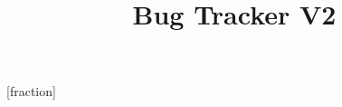 \documentclass{beamer}
\author[\color{white}Alexandru Manafu]{}
\title[Bug Tracker]{ \color{azure(colorwheel)}Bug Tracker V2}
\date{}
\begin{document}
[fraction]



\newcommand{\slideExample}[2]
{

\begin{frame}
\frametitle{ \color{darkgreen} \hyperlink{introduction}{Introduction} \ \hyperlink{motivation}{Motivation} \   \color{jade} \textbf{Example} \ \color{charcoal} \hyperlink{conclusion}{Conclusion}  \color{white}\hspace{5ex}{\normalsize $\insertframenumber /\inserttotalframenumber$}}
\color{white}

\graphicspath{ {./images/examples/} }

\vspace{-4ex}
\begin{center}
#1 :\\ %
\vspace{2ex}
\texttt{[image: \#2]} %
\end{center}

\end{frame}

}
\newcommand{\slideIntroduction}[2]
{
\begin{frame}[label=#1]
\frametitle{\color{jade}\textbf{Introduction} \ \color{charcoal}    \hyperlink{motivation}{Motivation} \ \hyperlink{content}{Content} \ \hyperlink{conclusion}{Conclusion} \color{white}\hspace{6ex}{\normalsize $\insertframenumber /\inserttotalframenumber$}}

#2

\end{frame}
}
\newcommand{\slideMotivation}[2]
{
\begin{frame}[label=#1]
\frametitle{ \color{darkgreen} \hyperlink{introduction}{Introduction} \ \color{jade} \textbf{Motivation} \ \color{charcoal}  \hyperlink{content}{Content} \ \hyperlink{conclusion}{Conclusion}  \color{white}\hspace{6ex}{\normalsize $\insertframenumber /\inserttotalframenumber$}}

#2

\end{frame}
}
\end{document}
